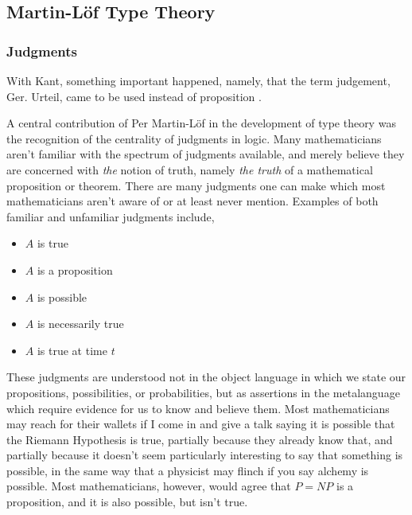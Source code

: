 \subsection{Martin-Löf Type Theory}
\subsubsection{Judgments}

\begin{displayquote}

With Kant, something important happened, namely, that the term judgement, Ger.
Urteil, came to be used instead of proposition \cite{mlMeanings}.

\end{displayquote}

A central contribution of Per Martin-Löf in the development of type theory was
the recognition of the centrality of judgments in logic. Many mathematicians
aren't familiar with the spectrum of judgments available, and merely believe
they are concerned with \emph{the} notion of truth, namely \emph{the truth} of a
mathematical proposition or theorem. There are many judgments one can make which
most mathematicians aren't aware of or at least never mention. Examples of both familiar
and unfamiliar judgments include,

\begin{itemize}

\item $A$ is true
\item $A$ is a proposition
\item $A$ is possible
\item $A$ is necessarily true
\item $A$ is true at time $t$

\end{itemize}

These judgments are understood not in the object language in which we state our
propositions, possibilities, or probabilities, but as assertions in the
metalanguage which require evidence for us to know and believe them. Most
mathematicians may reach for their wallets if I come in and give a talk saying
it is possible that the Riemann Hypothesis is true, partially because they
already know that, and partially because it doesn't seem particularly
interesting to say that something is possible, in the same way that a physicist
may flinch if you say alchemy is possible. Most mathematicians, however, would
agree that $P = NP$ is a proposition, and it is also possible, but isn't true.

